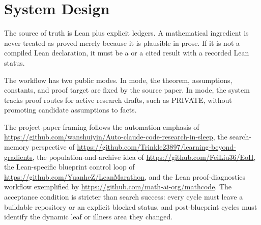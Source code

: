 \section{System Design}

The source of truth is Lean plus explicit ledgers.  A mathematical ingredient
is never treated as proved merely because it is plausible in prose.  If it is
not a compiled Lean declaration, it must be a \ProofObligation{} or a cited
result with a recorded Lean status.

The workflow has two public modes.  In  mode, the theorem,
assumptions, constants, and proof target are fixed by the source paper.  In
 mode, the system tracks proof routes for active
research drafts, such as PRIVATE, without promoting candidate assumptions to
facts.

The project-paper framing follows the automation emphasis of
\url{https://github.com/wanshuiyin/Auto-claude-code-research-in-sleep}, the search-memory perspective of \url{https://github.com/Trinkle23897/learning-beyond-gradients}, the
population-and-archive idea of \url{https://github.com/FeiLiu36/EoH}, the Lean-specific blueprint
control loop of \url{https://github.com/YuanheZ/LeanMarathon}, and the Lean proof-diagnostics
workflow exemplified by \url{https://github.com/math-ai-org/mathcode}.  The acceptance condition is
stricter than search success: every cycle must leave a buildable repository or
an explicit blocked status, and post-blueprint cycles must identify the
dynamic leaf or illness area they changed.


